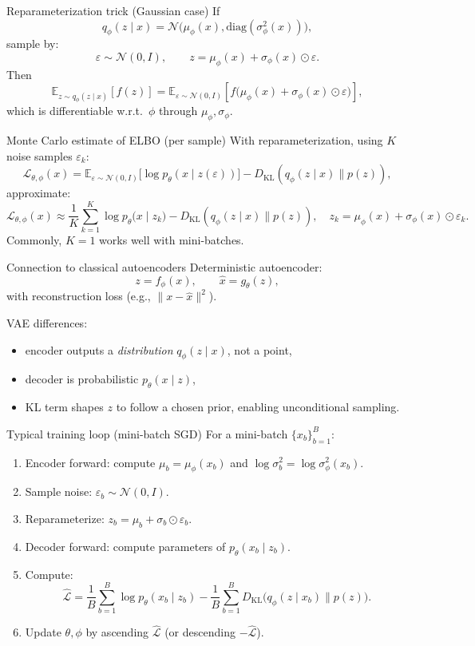 \documentclass[aspectratio=169]{beamer}
\newcommand{\E}{\mathbb{E}}
\newcommand{\KL}{D_{\mathrm{KL}}}
\newcommand{\cN}{\mathcal{N}}
\newcommand{\cL}{\mathcal{L}}
\newcommand{\diag}{\mathrm{diag}}
\begin{document}
\begin{frame}{Reparameterization trick (Gaussian case)}
If
\[
q_\phi(z\mid x)=\cN\big(\mu_\phi(x),\diag(\sigma_\phi^2(x))\big),
\]
sample by:
\[
\varepsilon \sim \cN(0,I),
\qquad
z=\mu_\phi(x)+\sigma_\phi(x)\odot \varepsilon.
\]
Then
\[
\E_{z\sim q_\phi(z\mid x)}[f(z)]
=
\E_{\varepsilon\sim \cN(0,I)}\left[f\big(\mu_\phi(x)+\sigma_\phi(x)\odot \varepsilon\big)\right],
\]
which is differentiable w.r.t.\ $\phi$ through $\mu_\phi,\sigma_\phi$.
\end{frame}

\begin{frame}{Monte Carlo estimate of ELBO (per sample)}
With reparameterization, using $K$ noise samples $\varepsilon_k$:
\[
\cL_{\theta,\phi}(x)
=
\E_{\varepsilon\sim \cN(0,I)}\big[\log p_\theta(x\mid z(\varepsilon))\big]
-\KL(q_\phi(z\mid x)\|p(z)),
\]
approximate:
\[
\cL_{\theta,\phi}(x)\approx
\frac{1}{K}\sum_{k=1}^K \log p_\theta\big(x\mid z_k\big)
-\KL(q_\phi(z\mid x)\|p(z)),
\quad z_k=\mu_\phi(x)+\sigma_\phi(x)\odot\varepsilon_k.
\]
Commonly, $K=1$ works well with mini-batches.
\end{frame}

\begin{frame}{Connection to classical autoencoders}
Deterministic autoencoder:
\[
z=f_\phi(x),\qquad \hat{x}=g_\theta(z),
\]
with reconstruction loss (e.g., $\|x-\hat{x}\|^2$).

VAE differences:
\begin{itemize}
  \item encoder outputs a \emph{distribution} $q_\phi(z\mid x)$, not a point,
  \item decoder is probabilistic $p_\theta(x\mid z)$,
  \item KL term shapes $z$ to follow a chosen prior, enabling unconditional sampling.
\end{itemize}
\end{frame}

\begin{frame}{Typical training loop (mini-batch SGD)}
For a mini-batch $\{x_b\}_{b=1}^B$:
\begin{enumerate}
  \item Encoder forward: compute $\mu_b=\mu_\phi(x_b)$ and $\log\sigma_b^2=\log\sigma_\phi^2(x_b)$.
  \item Sample noise: $\varepsilon_b\sim\cN(0,I)$.
  \item Reparameterize: $z_b=\mu_b+\sigma_b\odot\varepsilon_b$.
  \item Decoder forward: compute parameters of $p_\theta(x_b\mid z_b)$.
  \item Compute:
  \[
  \widehat{\cL}=\frac{1}{B}\sum_{b=1}^B \log p_\theta(x_b\mid z_b)
  -\frac{1}{B}\sum_{b=1}^B \KL\big(q_\phi(z\mid x_b)\|p(z)\big).
  \]
  \item Update $\theta,\phi$ by ascending $\widehat{\cL}$ (or descending $-\widehat{\cL}$).
\end{enumerate}
\end{frame}
\end{document}
